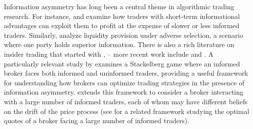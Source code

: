 \documentclass[10pt]{article}
\begin{document}
Information asymmetry has long been a central theme in algorithmic trading research. For instance, \citeauthor{muhlekarbe2017information} \cite{muhlekarbe2017information} and \citeauthor{cont2023fast} \cite{cont2023fast} examine how traders with short-term informational advantages can exploit them to profit at the expense of slower or less informed traders. Similarly, \citeauthor{herdegen2023liquidity} \cite{herdegen2023liquidity} analyze liquidity provision under adverse selection, a scenario where one party holds superior information. There is also a rich literature on insider trading that started with  \citeauthor{kyle1989informed} \cite{kyle1989informed, kyle1985continuous}, \citeauthor{back1992insider} \cite{back1992insider} -- more recent work include \citeauthor{campi2011dynamic} \cite{campi2011dynamic} and \citeauthor{ccetin2021pricing} \cite{ccetin2021pricing}. A particularly relevant study by \citeauthor{cartea2022brokers} \cite{cartea2022brokers} examines a Stackelberg game where an informed broker faces both informed and uninformed traders, providing a useful framework for understanding how brokers can optimize trading strategies in the presence of information asymmetry. \citeauthor{bergault2024mean} \cite{bergault2024mean} extends this framework to consider a broker interacting with a large number of informed traders, each of whom may have different beliefs on the drift of the price process (see \citeauthor{baldacci2023mean} \cite{baldacci2023mean} for a related framework studying the optimal quotes of a broker facing a large number of informed traders).\\
\iffalse
\end{document}
